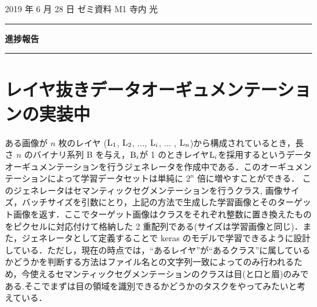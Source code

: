 \documentclass[onecolumn]{ujarticle}     %
\begin{document}
	
	
	\noindent
	
	\hspace{1em}
	2019 年 6 月 28 日
	ゼミ資料
	\hfill
	M1 寺内 光
	
	\vspace{2mm}
	
	\hrule
	
	\begin{center}
		{\Large \bf 進捗報告}
	\end{center}
	
	
	\hrule
	\vspace{3mm}
	
	\section{レイヤ抜きデータオーギュメンテーションの実装中}
	ある画像が $n$ 枚のレイヤ ($\rm{L}_{1}$, $\rm{L}_{2}$, ..., ${\rm{L}}_{i}$, ... , ${\rm{L}}_{n}$)から構成されているとき，長さ $n$ のバイナリ系列 B を与え，${\rm{B}}_{i}$が 1 のときレイヤ${\rm{L}}_{i}$を採用するというデータオーギュメンテーションを行うジェネレータを作成中である．このオーギュメンテーションによって学習データセットは単純に $2^{n}$ 倍に増やすことができる．
	このジェネレータはセマンティックセグメンテーションを行うクラス, 画像サイズ，バッチサイズを引数にとり，上記の方法で生成した学習画像とそのターゲット画像を返す．ここでターゲット画像はクラスをそれぞれ整数に置き換えたものをピクセルに対応付けて格納した 2 重配列である(サイズは学習画像と同じ)．また，ジェネレータとして定義することで keras のモデルで学習できるように設計している．ただし，現在の時点では，“あるレイヤ”が“あるクラス”に属しているかどうかを判断する方法はファイル名との文字列一致によってのみ行われるため，今使えるセマンティックセグメンテーションのクラスは目(と口と眉)のみである.そこでまずは目の領域を識別できるかどうかのタスクをやってみたいと考えている．
	
\end{document}
